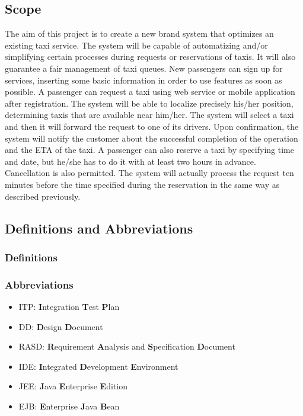 \subsection{Scope}
The aim of this project is to create a new brand system that optimizes an 
existing taxi service.
The system will be capable of automatizing and/or simplifying certain 
processes during requests or reservations of taxis.
It will also guarantee a fair management of taxi queues.
New passengers can sign up for services, inserting some basic information in order to use features as soon as possible.
A passenger can request a taxi using web service or mobile
application after registration. The system will be able to localize precisely his/her position, determining taxis that are available near
him/her. The system will select a taxi and then it will forward the request to one of its drivers.
Upon confirmation, the system will notify the customer about the successful completion of the operation and the ETA of the taxi. A passenger can also reserve a taxi by specifying time and date, but he/she has to do it with at least two hours in advance. Cancellation is also permitted. The system will actually process the request ten minutes before the time specified during the reservation in the same way as described previously.
\subsection{Definitions and Abbreviations}
\subsubsection{Definitions}
\subsubsection{Abbreviations}
\begin{itemize}
	\item ITP: \textbf{I}ntegration \textbf{T}est \textbf{P}lan
	\item DD: \textbf{D}esign \textbf{D}ocument
	\item RASD: \textbf{R}equirement \textbf{A}nalysis and \textbf{S}pecification \textbf{D}ocument
	\item IDE: \textbf{I}ntegrated \textbf{D}evelopment \textbf{E}nvironment
	\item JEE: \textbf{J}ava \textbf{E}nterprise \textbf{E}dition
	\item EJB: \textbf{E}nterprise \textbf{J}ava \textbf{B}ean
\end{itemize}
